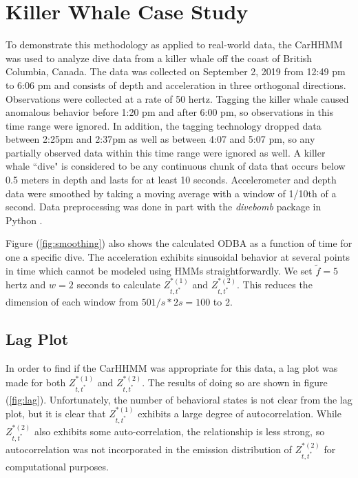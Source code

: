 
\section{Killer Whale Case Study}


To demonstrate this methodology as applied to real-world data, the CarHHMM was used to analyze dive data from a killer whale off the coast of British Columbia, Canada. The data was collected on September 2, 2019 from 12:49 pm to 6:06 pm and consists of depth and acceleration in three orthogonal directions. Observations were collected at a rate of 50 hertz. Tagging the killer whale caused anomalous behavior before 1:20 pm and after 6:00 pm, so observations in this time range were ignored. In addition, the tagging technology dropped data between 2:25pm and 2:37pm as well as between 4:07 and 5:07 pm, so any partially observed data within this time range were ignored as well. A killer whale ``dive" is considered to be any continuous chunk of data that occurs below 0.5 meters in depth and lasts for at least 10 seconds. Accelerometer and depth data were smoothed by taking a moving average with a window of 1/10th of a second. Data preprocessing was done in part with the \textit{divebomb} package in Python \cite{Nunes:2018}.

Figure (\ref{fig:smoothing}) also shows the calculated ODBA as a function of time for one a specific dive. The acceleration exhibits sinusoidal behavior at several points in time which cannot be modeled using HMMs straightforwardly. We set $\tilde{f} = 5$ hertz and $w = 2$ seconds to calculate $Z^{*(1)}_{t,t^*}$ and $Z^{*(2)}_{t,t^*}$. This reduces the dimension of each window from $50 1/s * 2 s = 100$ to 2.

\subsection{Lag Plot}

In order to find if the CarHHMM was appropriate for this data, a lag plot was made for both $Z^{*(1)}_{t,t^*}$ and $Z^{*(2)}_{t,t^*}$. The results of doing so are shown in figure (\ref{fig:lag}). Unfortunately, the number of behavioral states is not clear from the lag plot, but it is clear that $Z^{*(1)}_{t,t^*}$ exhibits a large degree of autocorrelation. While $Z^{*(2)}_{t,t^*}$ also exhibits some auto-correlation, the relationship is less strong, so autocorrelation was not incorporated in the emission distribution of $Z^{*(2)}_{t,t^*}$ for computational purposes.

